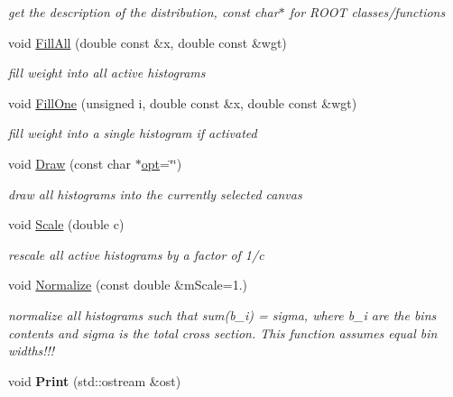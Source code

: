 \begin{DoxyCompactItemize}
\begin{DoxyCompactList}\small\item\em get the description of the distribution, const char$\ast$ for R\-O\-O\-T classes/functions \end{DoxyCompactList}\item 
void \hyperlink{classHistArray_ae8d7189d1f2b9710a3228deac3eb1fa4}{Fill\-All} (double const \&x, double const \&wgt)
\begin{DoxyCompactList}\small\item\em fill weight into all active histograms \end{DoxyCompactList}\item 
void \hyperlink{classHistArray_a38e7f00ba4f87c20ca1c3e0a5efc2ad9}{Fill\-One} (unsigned i, double const \&x, double const \&wgt)
\begin{DoxyCompactList}\small\item\em fill weight into a single histogram if activated \end{DoxyCompactList}\item 
void \hyperlink{classHistArray_a4ebaa67b67958c1ee70ebdb056b5a389}{Draw} (const char $\ast$\hyperlink{structopt}{opt}=\char`\"{}\char`\"{})
\begin{DoxyCompactList}\small\item\em draw all histograms into the currently selected canvas \end{DoxyCompactList}\item 
\hypertarget{classHistArray_a64fb4832bfab2d8e2e47e56d99902236}{void \hyperlink{classHistArray_a64fb4832bfab2d8e2e47e56d99902236}{Scale} (double c)}\label{classHistArray_a64fb4832bfab2d8e2e47e56d99902236}

\begin{DoxyCompactList}\small\item\em rescale all active histograms by a factor of 1/c \end{DoxyCompactList}\item 
void \hyperlink{classHistArray_a1a5eb9be28921e67bf3612e5b82954df}{Normalize} (const double \&m\-Scale=1.)
\begin{DoxyCompactList}\small\item\em normalize all histograms such that sum(b\-\_\-i) = sigma, where b\-\_\-i are the bins contents and sigma is the total cross section. This function assumes equal bin widths!!! \end{DoxyCompactList}\item 
\hypertarget{classHistArray_adb997e3f81ccdf02e7964dcbac1bff6e}{void {\bfseries Print} (std\-::ostream \&ost)}\label{classHistArray_adb997e3f81ccdf02e7964dcbac1bff6e}

\end{DoxyCompactItemize}
